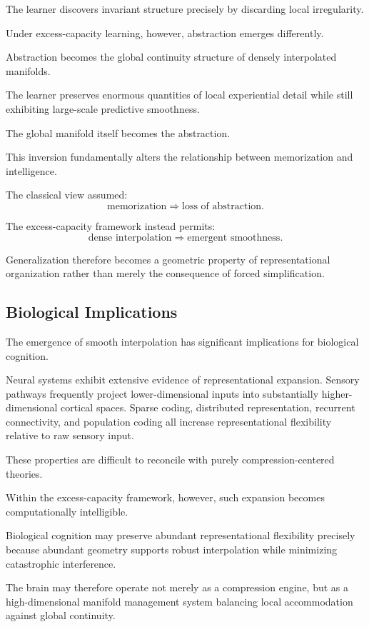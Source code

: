 \documentclass[12pt,a4paper]{article}
\begin{document}
The learner discovers invariant structure precisely by discarding local irregularity.

Under excess-capacity learning, however, abstraction emerges differently.

Abstraction becomes the global continuity structure of densely interpolated manifolds.

The learner preserves enormous quantities of local experiential detail while still exhibiting large-scale predictive smoothness.

The global manifold itself becomes the abstraction.

This inversion fundamentally alters the relationship between memorization and intelligence.

The classical view assumed:
\[
\text{memorization}
\Rightarrow
\text{loss of abstraction}.
\]

The excess-capacity framework instead permits:
\[
\text{dense interpolation}
\Rightarrow
\text{emergent smoothness}.
\]

Generalization therefore becomes a geometric property of representational organization rather than merely the consequence of forced simplification.

\subsection{Biological Implications}

The emergence of smooth interpolation has significant implications for biological cognition.

Neural systems exhibit extensive evidence of representational expansion. Sensory pathways frequently project lower-dimensional inputs into substantially higher-dimensional cortical spaces. Sparse coding, distributed representation, recurrent connectivity, and population coding all increase representational flexibility relative to raw sensory input.

These properties are difficult to reconcile with purely compression-centered theories.

Within the excess-capacity framework, however, such expansion becomes computationally intelligible.

Biological cognition may preserve abundant representational flexibility precisely because abundant geometry supports robust interpolation while minimizing catastrophic interference.

The brain may therefore operate not merely as a compression engine, but as a high-dimensional manifold management system balancing local accommodation against global continuity.
\end{document}
